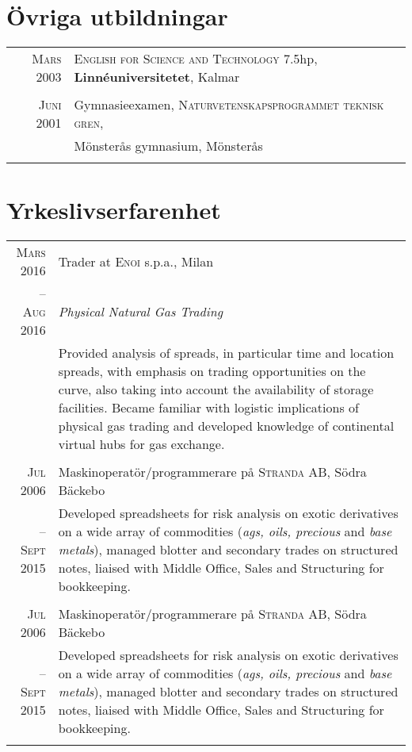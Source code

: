 \documentclass[11pt,a4paper]{article}
\begin{document}
\section{Övriga utbildningar}
\begin{tabularx}{\textwidth}{r|X}	
	\textsc{Mars} 2003& \textsc{English for Science and Technology} 7.5hp, \textbf{Linnéuniversitetet}, Kalmar\\
	\multicolumn{2}{c}{} \\
	
	\textsc{Juni} 2001& Gymnasieexamen, \textsc{Naturvetenskapsprogrammet teknisk gren},\\ 
	&{Mönsterås gymnasium}, Mönsterås\\
	\multicolumn{2}{c}{} \\
\end{tabularx}

\section{Yrkeslivserfarenhet}
\begin{tabularx}{\textwidth}{r|X}
	\textsc{Mars 2016} & Trader at \textsc{Enoi} s.p.a., Milan \\
	\textsc{-- Aug 2016}&\emph{Physical Natural Gas Trading}\\
	&\footnotesize{Provided analysis of spreads, in particular time and location spreads, with emphasis on trading opportunities on the curve, also taking into account the availability of storage facilities. Became familiar with logistic implications of physical gas trading and developed knowledge of continental virtual hubs for gas exchange.}\\
	\multicolumn{2}{c}{} \\
	
	\textsc{Jul 2006} & Maskinoperatör/programmerare på \textsc{Stranda AB}, Södra Bäckebo \\
	-- \textsc{Sept 2015}&\footnotesize{Developed spreadsheets for risk analysis on exotic derivatives on a wide array of commodities (\textit{ags, oils, precious} and \textit{base metals}), managed blotter and secondary trades on structured notes, liaised with Middle Office, Sales and Structuring for bookkeeping.}\\
	\multicolumn{2}{c}{} \\

	\textsc{Jul 2006} & Maskinoperatör/programmerare på \textsc{Stranda AB}, Södra Bäckebo \\
	-- \textsc{Sept 2015}&\footnotesize{Developed spreadsheets for risk analysis on exotic derivatives on a wide array of commodities (\textit{ags, oils, precious} and \textit{base metals}), managed blotter and secondary trades on structured notes, liaised with Middle Office, Sales and Structuring for bookkeeping.}\\
\multicolumn{2}{c}{} \\
\end{tabularx}
\end{document}
